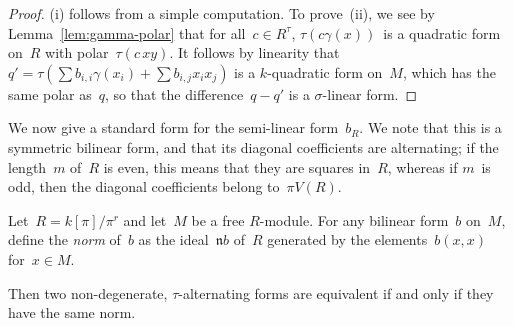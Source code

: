 \documentclass{article}
\def\mat#1{\begin{pmatrix}#1\end{pmatrix}}
\DeclareMathOperator\Quad{Quad}
\DeclareMathOperator\Alt{Alt}
\def\kR{_{(k,R)}}
\let\fr\mathfrak
\begin{document}
\begin{proof}
(i) follows from a simple computation. To prove~(ii), we see by
Lemma~\ref{lem:gamma-polar} that for all~$c ∈ R^{τ}$, $τ(c γ(x))$~is a
quadratic form on~$R$ with polar~$τ(c\, xy)$. It follows by linearity
that~$q' = τ(∑ b_{i,i} γ(x_i) + ∑ b_{i,j} x_i x_j)$ is a $k$-quadratic
form on~$M$, which has the same polar as~$q$, so that
the difference~$q - q'$ is a $σ$-linear form.
\end{proof}


We now give a standard form for the semi-linear form~$b_R$. We note that
this is a symmetric bilinear form, and that its diagonal coefficients are
alternating; if the length~$m$ of~$R$ is even, this means that they are
squares in~$R$, whereas if $m$~is odd, then the diagonal coefficients
belong to~$π V(R)$.


\begin{prop}\label{prop:eqv-norm}
Let~$R = k[π]/π^r$ and let~$M$ be a free $R$-module. For any bilinear
form~$b$ on~$M$, define the \emph{norm} of~$b$ as the ideal~$\fr n b$ of~$R$
generated by the elements~$b(x, x)$ for~$x ∈ M$.

Then two non-degenerate, $τ$-alternating forms are equivalent if and only
if they have the same norm.
\end{prop}

\end{document}
